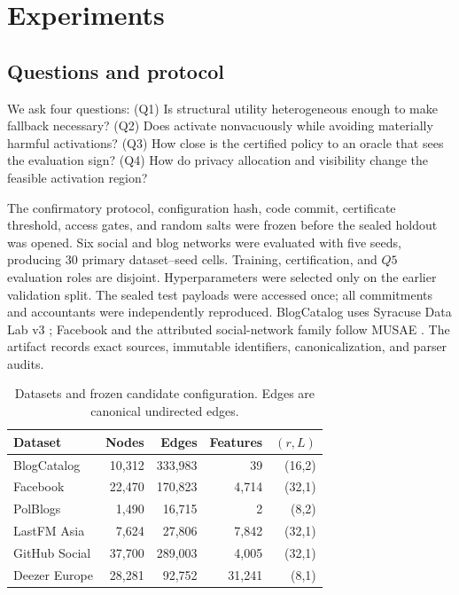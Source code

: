 \section{Experiments}
\label{sec:experiments}

\subsection{Questions and protocol}

We ask four questions: (Q1) Is structural utility heterogeneous enough to make
fallback necessary? (Q2) Does \method{} activate nonvacuously while avoiding
materially harmful activations? (Q3) How close is the certified policy to an
oracle that sees the evaluation sign? (Q4) How do privacy allocation and
visibility change the feasible activation region?

The confirmatory protocol, configuration hash, code commit, certificate
threshold, access gates, and random salts were frozen before the sealed
holdout was opened. Six social and blog networks were evaluated with five
seeds, producing $30$ primary dataset--seed cells. Training, certification,
and $Q5$ evaluation roles are disjoint. Hyperparameters were selected only on
the earlier validation split. The sealed test payloads were accessed once;
all commitments and accountants were independently reproduced.
BlogCatalog uses Syracuse Data Lab v3 \cite{zafarani2026datalab}; Facebook and
the attributed social-network family follow MUSAE
\cite{rozemberczki2021musae}. The artifact records exact sources, immutable
identifiers, canonicalization, and parser audits.

\begin{table}[t]
\caption{Datasets and frozen candidate configuration. Edges are canonical
undirected edges.}
\label{tab:datasets}
\centering
\footnotesize
\setlength{\tabcolsep}{3.2pt}
\begin{tabular}{lrrrr}
\toprule
Dataset & Nodes & Edges & Features & $(r,L)$\\
\midrule
BlogCatalog & 10,312 & 333,983 & 39 & (16,2)\\
Facebook & 22,470 & 170,823 & 4,714 & (32,1)\\
PolBlogs & 1,490 & 16,715 & 2 & (8,2)\\
LastFM Asia & 7,624 & 27,806 & 7,842 & (32,1)\\
GitHub Social & 37,700 & 289,003 & 4,005 & (32,1)\\
Deezer Europe & 28,281 & 92,752 & 31,241 & (8,1)\\
\bottomrule
\end{tabular}
\end{table}

